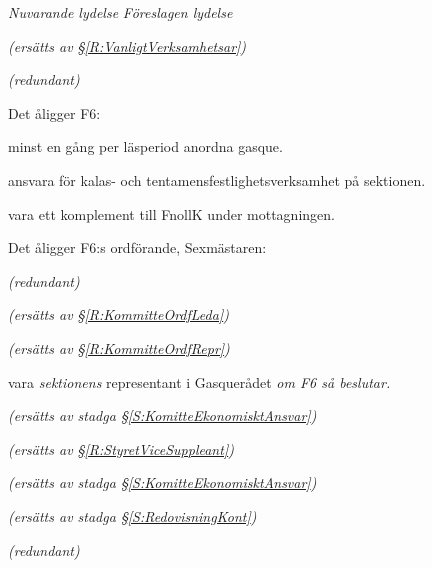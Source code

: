 \documentclass{article}
\newenvironment{lydelse}
    {\begin{paracol}{2}%
        \emph{Nuvarande lydelse}%
        \switchcolumn%
        \emph{Föreslagen lydelse}%
    \end{paracol}%
    \begin{enumerate}[label=\thesubsection.\arabic*]%
    \begin{paracol}{2}%
    }{\end{paracol}\end{enumerate}}
\begin{document}
\begin{lydelse}
    \item[] \emph{(ersätts av \S \ref{R:VanligtVerksamhetsar})}\vspace{1.2em}
    
    \item[] \emph{(redundant)}\vspace{5.8em}
    
    \item Det åligger F6:
    \begin{aligganden}
        \item minst en gång per läsperiod anordna gasque.
        \item ansvara för kalas- och tentamensfestlighetsverksamhet på sektionen.
        \item vara ett komplement till FnollK under mottagningen.
    \end{aligganden}
    
    \item Det åligger F6:s ordförande, Sexmästaren:
    \begin{aligganden}
        \item[] \emph{(redundant)}
        \item[] \emph{(ersätts av \S \ref{R:KommitteOrdfLeda})}
        \item[] \emph{(ersätts av \S \ref{R:KommitteOrdfRepr})}\vspace{3em}
        \item vara \emph{sektionens} representant i Gasquerådet \emph{om F6 så beslutar.}\vspace{1.4em}
        \item[] \emph{(ersätts av stadga \S \ref{S:KomitteEkonomisktAnsvar})}
    \end{aligganden}
    
    \vspace{2.6em}
    \begin{aligganden}
        \item[] \emph{(ersätts av \S \ref{R:StyretViceSuppleant})} \vspace{6.4em}
        \item[] \emph{(ersätts av stadga \S \ref{S:KomitteEkonomisktAnsvar})}\vspace{1.6em}
        \item[] \emph{(ersätts av stadga \S \ref{S:RedovisningKont})}\vspace{1.6em}
        \item[] \emph{(redundant)}
    \end{aligganden}
    
\end{lydelse}
\end{document}
